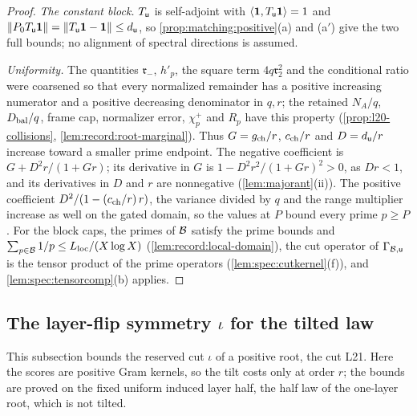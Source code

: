 \begin{proof}
\emph{The constant block.} $T_\mathsf u$ is self-adjoint with $\left\langle \mathbf 1,T_\mathsf u\mathbf 1\right\rangle=1$ and
$\|P_0T_\mathsf u\mathbf 1\|=\|T_\mathsf u\mathbf 1-\mathbf 1\|\le d_\mathsf u$, so \cref{prop:matching:positive}(a)
and (a$'$) give the two full bounds; no alignment of spectral directions is assumed.

\emph{Uniformity.} The quantities $\mathfrak r_-$, $h'_p$, the square term $4q\mathfrak r_2^2$
and the conditional ratio were coarsened so that every normalized remainder has a positive
increasing numerator and a positive decreasing denominator in $q,r$; the retained
$N_A/q$, $D_{\rm bal}/q$, frame cap, normalizer error, $\chi^+_p$ and $R_p$ have this
property (\cref{prop:l20-collisions}, \cref{lem:record:root-marginal}). Thus
$G=g_{\rm ch}/r$, $c_{\rm ch}/r$ and $D=d_\mathsf u/r$ increase toward a smaller prime
endpoint. The negative coefficient is $G+D^2r/(1+Gr)$; its derivative in $G$ is
$1-D^2r^2/(1+Gr)^2>0$, as $Dr<1$, and its derivatives in $D$ and $r$ are nonnegative
(\cref{lem:majorant}(ii)). The
positive coefficient $D^2/(1-(c_{\rm ch}/r)\,r)$, the variance divided by $q$ and the range multiplier
increase as well on the gated domain, so the values at $P$ bound every prime $p\ge P$.
For the block caps, the primes of $\mathcal B$ satisfy the prime bounds and
$\sum_{p\in\mathcal B}1/p\le L_{\rm loc}/(X\log X)$ (\cref{lem:record:local-domain}), the cut
operator of $\Gamma_{\mathcal B,\mathsf u}$ is the tensor product of the prime operators
(\cref{lem:spec:cutkernel}(f)), and \cref{lem:spec:tensorcomp}(b) applies.
\end{proof}

\subsection{The layer-flip symmetry \texorpdfstring{$\iota$}{iota} for the tilted law}\label{subsec:positive-root-layer}

This subsection bounds the reserved cut $\iota$ of a positive root, the cut L21. Here the
scores are positive Gram kernels, so the tilt costs only at order $r$; the bounds are
proved on the fixed uniform induced layer half, the half law of the one-layer root, which
is not tilted.

